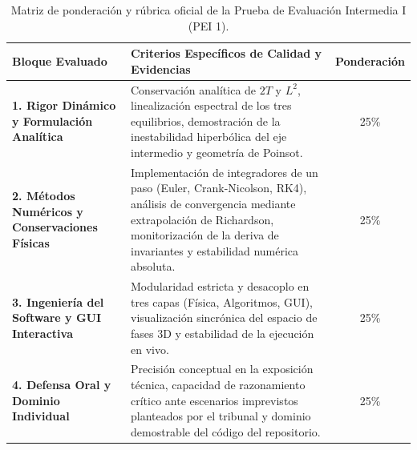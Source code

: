 \documentclass[11pt, a4paper]{article}
\begin{document}
\begin{table}[htbp]
\centering
\small
\begin{tabularx}{\textwidth}{p{4.0cm} p{9.7cm} c }
\toprule
\textbf{Bloque Evaluado} & \textbf{Criterios Específicos de Calidad y Evidencias} & \textbf{Ponderación} 
 \\
\midrule
\textbf{1. Rigor Dinámico y Formulación Analítica} 
& 
Conservación analítica de $2T$ y $L^2$, linealización espectral de los tres equilibrios, 
demostración de la inestabilidad hiperbólica del eje intermedio y geometría de Poinsot. & 25\% \\
\addlinespace[0.4em]
\textbf{2. Métodos Numéricos y Conservaciones Físicas} & Implementación de integradores 
de un paso (Euler, Crank-Nicolson, RK4), análisis de convergencia 
mediante extrapolación de Richardson, monitorización de la 
deriva de invariantes y estabilidad numérica absoluta. & 25\% \\
\addlinespace[0.4em]
\textbf{3. Ingeniería del Software y GUI Interactiva} & Modularidad estricta 
y desacoplo en tres capas (Física, Algoritmos, GUI), 
 visualización sincrónica del espacio de fases 3D y estabilidad de la ejecución en vivo. & 25\%  \\
\addlinespace[0.4em]
\textbf{4. Defensa Oral y Dominio Individual} & 
Precisión conceptual en la exposición técnica, 
capacidad de razonamiento crítico ante escenarios imprevistos planteados por el tribunal 
y dominio demostrable del código del repositorio. & 25\%  \\
\bottomrule
\end{tabularx}
\caption{Matriz de ponderación y rúbrica oficial de la Prueba de Evaluación Intermedia I (PEI 1).}
\label{tab:rubrica_pei1}
\end{table}
\end{document}
